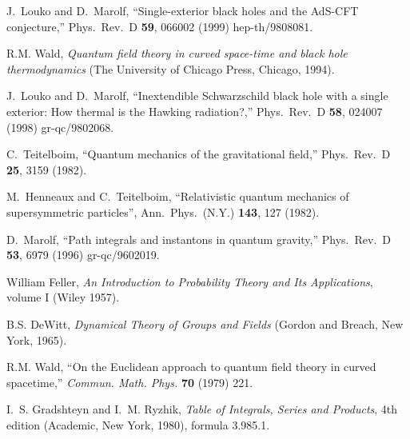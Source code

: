 \documentclass[a4paper,12pt]{article}
\begin{document}
\begin{thebibliography}{10}
J.~Louko and D.~Marolf,
``Single-exterior black holes and the AdS-CFT conjecture,''
Phys.\ Rev.\ D {\bf 59}, 066002 (1999)
hep-th/9808081.

 R.M. Wald, 
{\it Quantum field theory in curved space-time and
black hole thermodynamics\/} 
(The University of Chicago Press, Chicago, 1994).

J.~Louko and D.~Marolf,
``Inextendible Schwarzschild black hole with a single exterior: How
thermal is the Hawking radiation?,'' 
Phys.\ Rev.\ D {\bf 58}, 024007 (1998)
gr-qc/9802068. 

C.~Teitelboim, 
``Quantum mechanics of the gravitational field,''
Phys.\ Rev.\ D {\bf 25}, 3159 (1982).

 M.~Henneaux and C.~Teitelboim, ``Relativistic
  quantum mechanics of supersymmetric particles'', Ann.\ Phys.\ (N.Y.)
  {\bf 143}, 127 (1982).  

D.~Marolf, 
``Path integrals and instantons in quantum gravity,''
Phys.\ Rev.\ D {\bf 53}, 6979 (1996) 
gr-qc/9602019. 

William Feller,
{\it An Introduction to Probability Theory and Its Applications},
 volume I (Wiley 1957).

B.S. DeWitt, {\it Dynamical Theory of Groups and Fields}
(Gordon and Breach, New York, 1965).

R.M. Wald,  ``On the Euclidean approach to quantum field theory in
curved spacetime,'' {\it Commun. Math. Phys.} {\bf 70} (1979) 221.

  I.~S.  Gradshteyn and I.~M.  Ryzhik, {\it Table of Integrals, Series
    and Products}, 4th edition (Academic, New York, 1980), formula 
3.985.1.


\end{thebibliography} 
 
\end{document}
